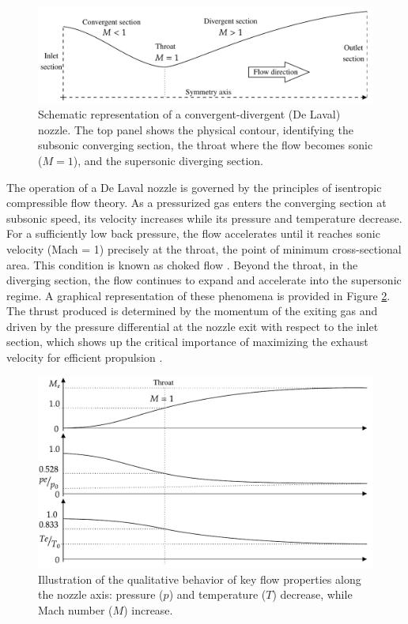 \documentclass[tg, EN]{ufabcFHZh_tg}
\begin{document}
\begin{figure}[H]
    \centering
    \includegraphics[width=\textwidth]{Figuras/cd_nozzle.pdf} 
    \caption{Schematic representation of a convergent-divergent (De Laval) nozzle. The top panel shows the physical contour, identifying the subsonic converging section, the throat where the flow becomes sonic ($M=1$), and the supersonic diverging section.}
    \label{fig:nozzle_representation}
\end{figure}

The operation of a De Laval nozzle is governed by the principles of isentropic compressible flow theory. As a pressurized gas enters the converging section at subsonic speed, its velocity increases while its pressure and temperature decrease. For a sufficiently low back pressure, the flow accelerates until it reaches sonic velocity (Mach = 1) precisely at the throat, the point of minimum cross-sectional area. This condition is known as choked flow \citep{sutton2010, zucrow1976,white2011}. Beyond the throat, in the diverging section, the flow continues to expand and accelerate into the supersonic regime. A graphical representation of these phenomena is provided in Figure \ref{fig:nozzle_qualitative}. The thrust produced is determined by the momentum of the exiting gas and driven by the pressure differential at the nozzle exit with respect to the inlet section, which shows up the critical importance of maximizing the exhaust velocity for efficient propulsion \citep{anderson2003}.


\begin{figure}[H]
    \centering
    \includegraphics[width=\textwidth]{Figuras/cd_nozzle_qualitative.pdf} 
    \caption{Illustration of the qualitative behavior of key flow properties along the nozzle axis: pressure ($p$) and temperature ($T$) decrease, while Mach number ($M$) increase.}
    \label{fig:nozzle_qualitative}
\end{figure}
\end{document}
